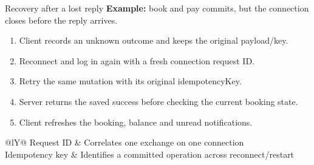 \documentclass[t,aspectratio=169]{beamer}
\newcommand{\gap}{\par\vspace{0.18cm}}
\begin{document}
\begin{frame}{Recovery after a lost reply}
\small
\textbf{Example:} book and pay commits, but the connection closes before the reply arrives.
\gap
\begin{enumerate}\setlength{\itemsep}{7pt}
\item Client records an unknown outcome and keeps the original payload/key.
\item Reconnect and log in again with a fresh connection request ID.
\item Retry the same mutation with its original idempotencyKey.
\item Server returns the saved success before checking the current booking state.
\item Client refreshes the booking, balance and unread notifications.
\end{enumerate}
\gap
\begin{tabularx}{\textwidth}{@{}lY@{}}
\toprule
Request ID & Correlates one exchange on one connection\\
Idempotency key & Identifies a committed operation across reconnect/restart\\
\bottomrule
\end{tabularx}
\end{frame}

\hidePageNumber
\hustthankyou
{}
\end{document}
